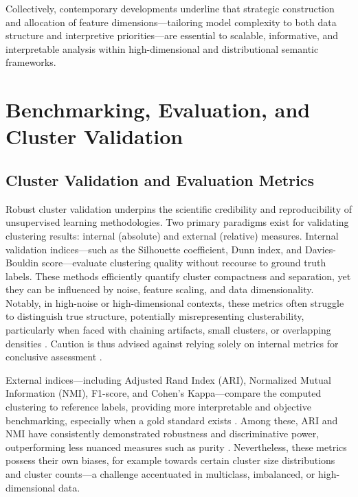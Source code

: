 Collectively, contemporary developments underline that strategic construction and allocation of feature dimensions—tailoring model complexity to both data structure and interpretive priorities—are essential to scalable, informative, and interpretable analysis within high-dimensional and distributional semantic frameworks.

\section{Benchmarking, Evaluation, and Cluster Validation}

\subsection{Cluster Validation and Evaluation Metrics}

Robust cluster validation underpins the scientific credibility and reproducibility of unsupervised learning methodologies. Two primary paradigms exist for validating clustering results: internal (absolute) and external (relative) measures. Internal validation indices—such as the Silhouette coefficient, Dunn index, and Davies-Bouldin score—evaluate clustering quality without recourse to ground truth labels. These methods efficiently quantify cluster compactness and separation, yet they can be influenced by noise, feature scaling, and data dimensionality. Notably, in high-noise or high-dimensional contexts, these metrics often struggle to distinguish true structure, potentially misrepresenting clusterability, particularly when faced with chaining artifacts, small clusters, or overlapping densities \cite{ref14,ref16,ref17,ref20,ref21,ref22,ref45,ref46,ref50,ref59,ref60,ref67,ref71,ref72,ref74,ref75,ref78,ref90,ref92,ref93,ref94,ref95,ref96,ref97,ref100,ref113}. Caution is thus advised against relying solely on internal metrics for conclusive assessment \cite{ref14,ref94}.

External indices—including Adjusted Rand Index (ARI), Normalized Mutual Information (NMI), F1-score, and Cohen’s Kappa—compare the computed clustering to reference labels, providing more interpretable and objective benchmarking, especially when a gold standard exists \cite{ref14,ref16,ref17,ref21,ref22,ref44,ref45,ref46,ref50,ref67,ref72,ref75,ref77,ref78,ref90,ref93,ref94,ref95,ref96,ref97,ref100,ref113}. Among these, ARI and NMI have consistently demonstrated robustness and discriminative power, outperforming less nuanced measures such as purity \cite{ref17,ref44}. Nevertheless, these metrics possess their own biases, for example towards certain cluster size distributions and cluster counts—a challenge accentuated in multiclass, imbalanced, or high-dimensional data.

